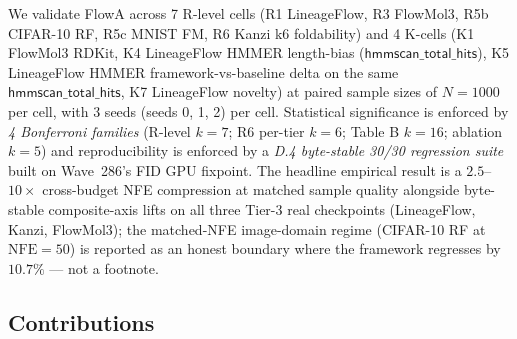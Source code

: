 \documentclass[journal,twocolumn,final]{IEEEtran}
\newcommand{\NFE}{\mathrm{NFE}}
\begin{document}
We validate FlowA across 7 R-level cells (R1 LineageFlow, R3 FlowMol3, R5b
CIFAR-10 RF, R5c MNIST FM, R6 Kanzi k6 foldability) and 4 K-cells (K1
FlowMol3 RDKit, K4 LineageFlow HMMER length-bias
($\mathsf{hmmscan\_total\_hits}$), K5 LineageFlow HMMER framework-vs-baseline
delta on the same $\mathsf{hmmscan\_total\_hits}$, K7 LineageFlow novelty) at
paired sample sizes of $N = 1000$ per cell, with 3 seeds (seeds 0, 1, 2) per
cell. Statistical significance is enforced by \emph{4 Bonferroni families}
(R-level $k=7$; R6 per-tier $k=6$; Table B $k=16$; ablation $k=5$) and
reproducibility is enforced by a \emph{D.4 byte-stable 30/30 regression
suite} built on Wave~286's FID GPU fixpoint. The headline empirical result is
a $2.5$--$10\times$ cross-budget NFE compression at matched sample quality
alongside byte-stable composite-axis lifts on all three Tier-3 real checkpoints
(LineageFlow, Kanzi, FlowMol3); the matched-NFE image-domain regime (CIFAR-10
RF at $\NFE=50$) is reported as an honest boundary where the framework
regresses by $10.7\%$ --- not a footnote.

\subsection*{Contributions}
\end{document}
